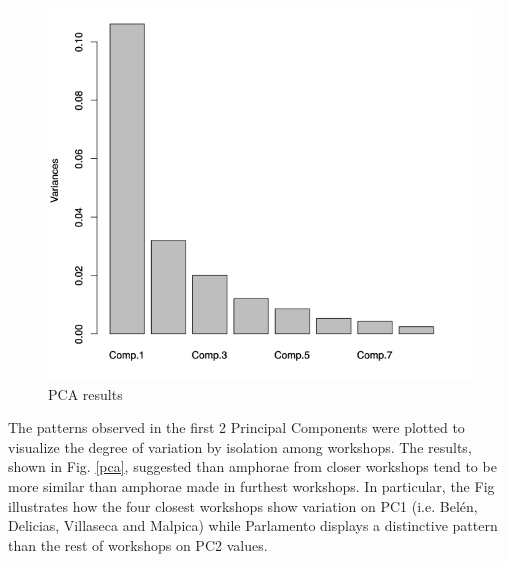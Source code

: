 \documentclass[review]{elsarticle}
\newcommand{\memo}[2]{\textcolor{#1}{#2}}
\newcommand{\xavi}[1]{\memo{orange}{xavi: #1\\}}
\newcommand{\maria}[1]{\memo{blue}{maria: #1\\}}
\begin{document}
\begin{figure}[htp]
	\centering
\includegraphics[scale=0.30]{pcaresults.png}
\caption{PCA results}
\label{pcaresults}
\end{figure} 

    

The patterns observed in the first 2 Principal Components were plotted to visualize the degree of variation by isolation among workshops. The results, shown in Fig. \ref{pca}, suggested than amphorae from closer workshops tend to be more similar than amphorae made in furthest workshops. In particular, the Fig illustrates how the four closest workshops show variation on PC1 (i.e. Bel\'en, Delicias, Villaseca and Malpica) while Parlamento displays a distinctive pattern than the rest of workshops on PC2 values. 


\end{document}
